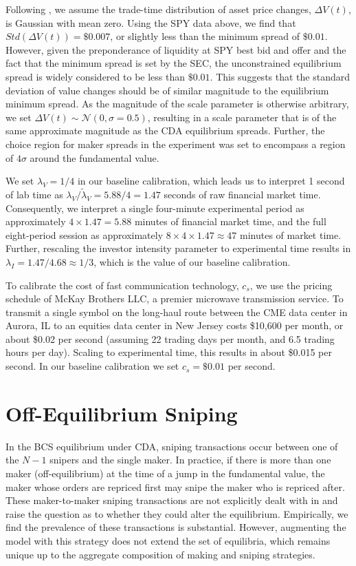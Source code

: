 \documentclass[12pt]{article}
\begin{document}
\begin{appendices}
Following \citet{Aldrich2016}, we assume the trade-time distribution of asset price changes, $\Delta V(t)$, is Gaussian with mean zero. Using the SPY data above, we find that $Std(\Delta V(t)) = \$0.007$, or slightly less than the minimum spread of $\$0.01$.  However, given the preponderance of liquidity at SPY best bid and offer and the fact that the minimum spread is set by the SEC, the unconstrained equilibrium spread is widely considered to be less than $\$0.01$. This suggests that the standard deviation of value changes should be of similar magnitude to the equilibrium minimum spread. As the magnitude of the scale parameter is otherwise arbitrary, we set $\Delta V(t) \sim \mathcal{N}(0,\sigma=0.5)$, resulting in a scale parameter that is of the same approximate magnitude as the CDA equilibrium spreads. Further, the choice region for maker spreads in the experiment was set to encompass a region of $4\sigma$ around the fundamental value.

We set $\lambda_V = 1/4$ in our baseline calibration, which leads us to interpret 1 second of lab time as $\lambda_V/\tilde{\lambda}_{V} = 5.88/4 = 1.47$ seconds of raw financial market time. Consequently, we interpret a single four-minute experimental period as approximately $4 \times 1.47 = 5.88$ minutes of financial market time, and the full eight-period session as approximately $8 \times 4 \times 1.47 \approx 47$ minutes of market time. Further, rescaling the investor intensity parameter to experimental time results in $\lambda_I = 1.47/4.68 \approx 1/3$, which is the value of our baseline calibration.

To calibrate the cost of fast communication technology, $c_s$, we use the pricing schedule of McKay Brothers LLC, a premier microwave transmission service. To transmit a single symbol on the long-haul route between the CME data center in Aurora, IL to an equities data center in New Jersey costs \$10,600 per month, or about \$0.02 per second (assuming 22 trading days per month, and 6.5 trading hours per day). Scaling to experimental time, this results in about \$0.015 per second. In our baseline calibration we set $c_s = \$0.01$ per second.

\section{Off-Equilibrium Sniping}
\label{makerSniping}

In the BCS equilibrium under CDA, sniping transactions occur between one of the $N-1$ snipers and the single maker. In practice, if there is more than one maker (off-equilibrium) at the time of a jump in the fundamental value, the maker whose orders are repriced first may snipe the maker who is repriced after. These maker-to-maker sniping transactions are not explicitly dealt with in  \cite{Budish2015} and raise the question as to whether they could alter the equilibrium. Empirically, we find the prevalence of these transactions is substantial. However, augmenting the model with this strategy does not extend the set of equilibria, which remains unique up to the aggregate composition of making and sniping strategies.  


\end{appendices}
\end{document}
